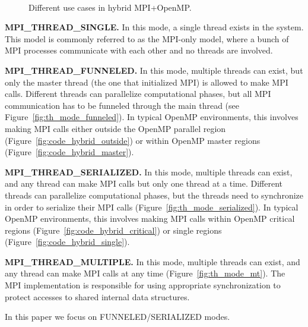 \begin{figure}[h]
\vspace{-1ex}
\setlength{\subfigcapskip}{5pt}
\centering
{}
\hfill
{}
\\
\hfill
{}
\vspace{-2.0ex}
\caption{Different use cases in hybrid MPI+OpenMP.}
\vspace{-2.5ex}
\label{fig:code_omp}
\end{figure}

\vspace{1.0ex}
\noindent\textbf{MPI\_THREAD\_SINGLE.}  In this mode, a single thread
exists in the system.  This model is commonly referred to as the
MPI-only model, where a bunch of MPI processes communicate with each
other and no threads are involved.

\vspace{1.0ex}
\noindent\textbf{MPI\_THREAD\_FUNNELED.}  In this mode, multiple
th\-reads can exist, but only the master thread (the one that
initialized MPI) is allowed to make MPI calls.  Different threads can
parallelize computational phases, but all MPI communication has to be
funneled through the main thread (see
Figure~\ref{fig:th_mode_funneled}).  In typical OpenMP environments,
this involves making MPI calls either outside the OpenMP parallel
region (Figure~\ref{fig:code_hybrid_outside}) or within OpenMP master
regions (Figure~\ref{fig:code_hybrid_master}).

\vspace{1.0ex}
\noindent\textbf{MPI\_THREAD\_SERIALIZED.}  In this mode, multiple
threads can exist, and any thread can make MPI calls but only one
thread at a time.  Different threads can parallelize computational
phases, but the threads need to synchronize in order to serialize
their MPI calls (Figure~\ref{fig:th_mode_serialized}).  In typical
OpenMP environments, this involves making MPI calls within OpenMP
critical regions (Figure~\ref{fig:code_hybrid_critical}) or single
regions (Figure~\ref{fig:code_hybrid_single}).

\vspace{1.0ex}
\noindent\textbf{MPI\_THREAD\_MULTIPLE.}  In this mode, multiple
thr\-eads can exist, and any thread can make MPI calls at any time
(Figure~\ref{fig:th_mode_mt}).  The MPI implementation is responsible
for using appropriate synchronization to protect accesses to shared
internal data structures.
\vspace{1.0ex}

In this paper we focus on FUNNELED/SERIALIZED modes.
